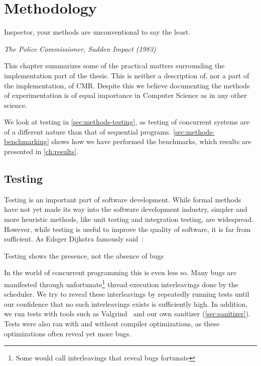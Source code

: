 \chapter{Methodology\label{ch:methodology}}

\epigraph{Inspector, your methods are unconventional to say the least.}{\textit{The Police Commissioner, Sudden Impact (1983)}}

This chapter summarizes some of the practical matters surrounding the implementation part of the
thesis. This is neither a description of, nor a part of the implementation, of CMR\@. Despite this
we believe documenting the methods of experimentation is of equal importance in Computer Science
as in any other science.

We look at testing in \cref{sec:methods-testing}, as testing of concurrent systems are of a
different nature than that of sequential programs.  \cref{sec:methods-benchmarking} shows how we
have performed the benchmarks, which results are presented in \cref{ch:results}.


\clearpage

\section{Testing\label{sec:methods-testing}}

Testing is an important part of software development. While formal methods have not yet made its
way into the software development industry, simpler and more heuristic methods, like unit testing
and integration testing, are widespread. However, while testing is useful to improve the quality of
software, it is far from sufficient. As Edsger Dijkstra famously said~\cite{buxton1970software}:
\begin{displayquote}
Testing shows the presence, not the absence of bugs
\end{displayquote}

In the world of concurrent programming this is even less so. Many bugs are manifested through
unfortunate\footnote{Some would call interleavings that reveal bugs fortunate} thread execution
interleavings done by the scheduler. We try to reveal these interleavings by repeatedly running
tests until our confidence that no such interleavings exists is sufficiently high. In addition, we
run tests with tools such as Valgrind~\cite{valgrind} and our own sanitizer (\cref{sec:sanitizer}).
Tests were also ran with and without compiler optimizations, as these optimizations often reveal
yet more bugs.


